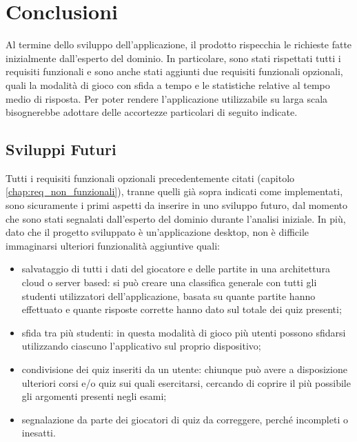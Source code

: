 

\chapter{Conclusioni}\label{conclusioni}
    Al termine dello sviluppo dell'applicazione, il prodotto rispecchia le richieste fatte inizialmente dall'esperto del dominio. In particolare, sono stati rispettati tutti i requisiti funzionali e sono anche stati aggiunti due requisiti funzionali opzionali, quali la modalità di gioco con sfida a tempo e le statistiche relative al tempo medio di risposta. Per poter rendere l'applicazione utilizzabile su larga scala bisognerebbe adottare delle accortezze particolari di seguito indicate.

    \section{Sviluppi Futuri}
    Tutti i requisiti funzionali opzionali precedentemente citati (capitolo \ref{chap:req_non_funzionali}), tranne quelli già sopra indicati come implementati, sono sicuramente i primi aspetti da inserire in uno sviluppo futuro, dal momento che sono stati segnalati dall'esperto del dominio durante l'analisi iniziale.
    In più, dato che il progetto sviluppato è un'applicazione desktop, non è difficile immaginarsi ulteriori funzionalità aggiuntive quali:
    
    \begin{itemize}
        \item salvataggio di tutti i dati del giocatore e delle partite in una architettura cloud o server based: si può creare una classifica generale con tutti gli studenti utilizzatori dell'applicazione, basata su quante partite hanno effettuato e quante risposte corrette hanno dato sul totale dei quiz presenti;
    
        \item sfida tra più studenti: in questa modalità di gioco più utenti possono sfidarsi utilizzando ciascuno l'applicativo sul proprio dispositivo;
        
        \item condivisione dei quiz inseriti da un utente: chiunque può avere a disposizione ulteriori corsi e/o quiz sui quali esercitarsi, cercando di coprire il più possibile gli argomenti presenti negli esami;
        
        \item segnalazione da parte dei giocatori di quiz da correggere, perché incompleti o inesatti.
    \end{itemize}
    
    

    
    